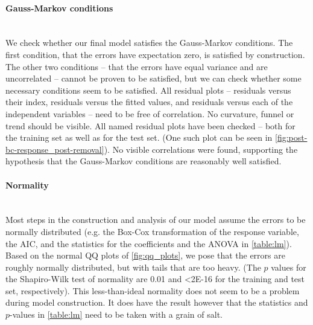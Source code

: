 \documentclass[a4paper, 12pt]{article}
\newcommand{\n}[1]{\num{#1}}
\begin{document}
\paragraph{Gauss-Markov conditions}\leavevmode\\
We check whether our final model satisfies the Gauss-Markov conditions. The first condition, that the errors have expectation zero, is satisfied by construction. The other two conditions -- that the errors have equal variance and are uncorrelated -- cannot be proven to be satisfied, but we can check whether some necessary conditions seem to be satisfied. All residual plots -- residuals versus their index, residuals versus the fitted values, and residuals versus each of the independent variables -- need to be free of correlation. No curvature, funnel or trend should be visible. All named residual plots have been checked -- both for the training set as well as for the test set. (One such plot can be seen in \cref{fig:post-bc-response_post-removal}). No visible correlations were found, supporting the hypothesis that the Gauss-Markov conditions are reasonably well satisfied.

\paragraph*{Normality}\leavevmode\\
Most steps in the construction and analysis of our model assume the errors to be normally distributed (e.g. the Box-Cox transformation of the response variable, the AIC, and the statistics for the coefficients and the ANOVA in \cref{table:lm}). Based on the normal QQ plots of \cref{fig:qq_plots}, we pose that the errors are roughly normally distributed, but with tails that are too heavy. (The $p$ values for the Shapiro-Wilk test of normality are \n{0.01} and \n{<2E-16} for the training and test set, respectively). This less-than-ideal normality does not seem to be a problem during model construction. It does have the result however that the statistics and $p$-values in \cref{table:lm} need to be taken with a grain of salt.
\end{document}
